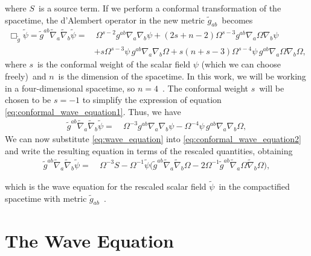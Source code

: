 %
where $S$~is a source term. If we perform a conformal transformation of the spacetime, the d'Alembert operator in the new metric $\tilde{g}_{ab}$~becomes
%
\begin{align}
    \Box_{\tilde{g}} \tilde{\psi} 
    = \tilde{g}^{ab} \tilde{\nabla}_a \tilde{\nabla}_b \tilde{\psi} 
    =&~\Omega^{s-2} g^{ab} \nabla_a \nabla_b \psi 
    + (2s + n - 2) \Omega^{s-3} g^{ab} \nabla_a \Omega \nabla_b \psi \nonumber \\
    &+ s \Omega^{s-3} \psi\, g^{ab} \nabla_a \nabla_b \Omega 
    + s(n + s - 3) \Omega^{s-4} \psi\, g^{ab} \nabla_a \Omega \nabla_b \Omega,
    \label{eq:conformal_wave_equation1}
\end{align}
%
where $s$~is the conformal weight of the scalar field $\psi$ (which we can choose freely)~and $n$~is the dimension of the spacetime. In this work, we will be working in a four-dimensional spacetime, so $n = 4$~. The conformal weight $s$~will be chosen to be $s = -1$ to simplify the expression of equation \eqref{eq:conformal_wave_equation1}. Thus, we have
%
\begin{align}
    \tilde{g}^{ab} \tilde{\nabla}_a \tilde{\nabla}_b \tilde{\psi} 
    =&~\Omega^{-3} g^{ab} \nabla_a \nabla_b \psi 
    - \Omega^{-4} \psi\, g^{ab} \nabla_a \nabla_b \Omega,
    \label{eq:conformal_wave_equation2}
\end{align}
%
We can now substitute \eqref{eq:wave_equation} into \eqref{eq:conformal_wave_equation2} and write the resulting equation in terms of the rescaled quantities, obtaining
%
\begin{align}
    \tilde{g}^{ab} \tilde{\nabla}_a \tilde{\nabla}_b \tilde{\psi} 
    =&~\Omega^{-3} S 
    - \Omega^{-1} \tilde{\psi} \bigg( 
        \tilde{g}^{ab} \tilde{\nabla}_a \tilde{\nabla}_b \Omega 
        - 2 \Omega^{-1} \tilde{g}^{ab} \tilde{\nabla}_a \Omega \tilde{\nabla}_b \Omega \bigg),
\end{align}

%
which is the wave equation for the rescaled scalar field $\tilde{\psi}$~in the compactified spacetime with metric $\tilde{g}_{ab}$~.

\section{The Wave Equation}
\label{section:wave_equation}

